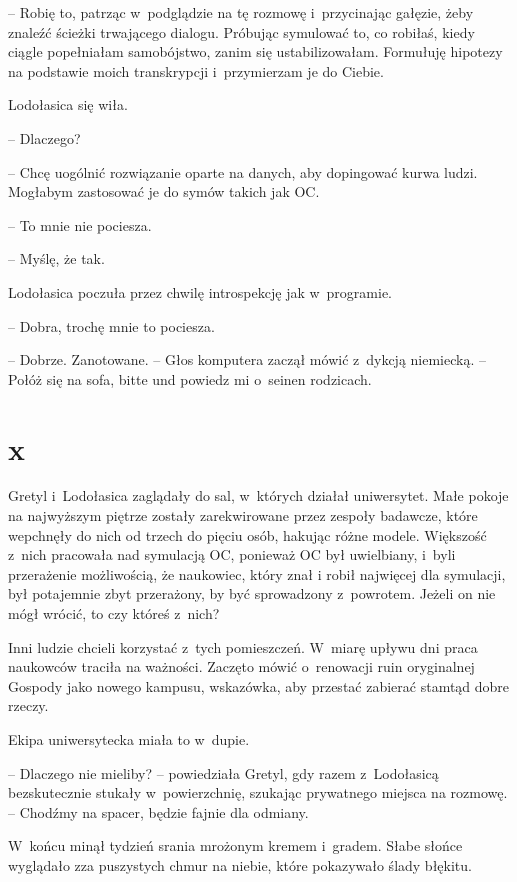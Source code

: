 \documentclass[oneside,polish,11pt,sfheadings]{mwbk}
\begin{document}
-- Robię to, patrząc w~podglądzie na tę rozmowę i~przycinając gałęzie,
żeby znaleźć ścieżki trwającego dialogu. Próbując symulować to, co
robiłaś, kiedy ciągle popełniałam samobójstwo, zanim się
ustabilizowałam. Formułuję hipotezy na podstawie moich transkrypcji i~przymierzam je do Ciebie.

Lodołasica się wiła. 

-- Dlaczego?

-- Chcę uogólnić rozwiązanie oparte na danych, aby dopingować kurwa
ludzi. Mogłabym zastosować je do symów takich jak OC.

-- To mnie nie pociesza.

-- Myślę, że tak.

Lodołasica poczuła przez chwilę introspekcję jak w~programie. 

-- Dobra,
trochę mnie to pociesza.

-- Dobrze. Zanotowane. -- Głos komputera zaczął mówić z~dykcją niemiecką.
-- Połóż się na sofa, bitte und powiedz mi o~seinen rodzicach.

\chapter*{x}

Gretyl i~Lodołasica zaglądały do sal, w~których działał uniwersytet.
Małe pokoje na najwyższym piętrze zostały zarekwirowane przez zespoły
badawcze, które wepchnęły do nich od trzech do pięciu osób, hakując
różne modele. Większość z~nich pracowała nad symulacją OC, ponieważ OC
był uwielbiany, i~byli przerażenie możliwością, że naukowiec, który znał
i robił najwięcej dla symulacji, był potajemnie zbyt przerażony, by być
sprowadzony z~powrotem. Jeżeli on nie mógł wrócić, to czy któreś z~nich?

Inni ludzie chcieli korzystać z~tych pomieszczeń. W~miarę upływu dni
praca naukowców traciła na ważności. Zaczęto mówić o~renowacji ruin
oryginalnej Gospody jako nowego kampusu, wskazówka, aby przestać
zabierać stamtąd dobre rzeczy.

Ekipa uniwersytecka miała to w~dupie.

-- Dlaczego nie mieliby? -- powiedziała Gretyl, gdy razem z~Lodołasicą
bezskutecznie stukały w~powierzchnię, szukając prywatnego miejsca na
rozmowę. -- Chodźmy na spacer, będzie fajnie dla odmiany. 

W~końcu minął
tydzień srania mrożonym kremem i~gradem. Słabe słońce wyglądało zza
puszystych chmur na niebie, które pokazywało ślady błękitu.
\end{document}
